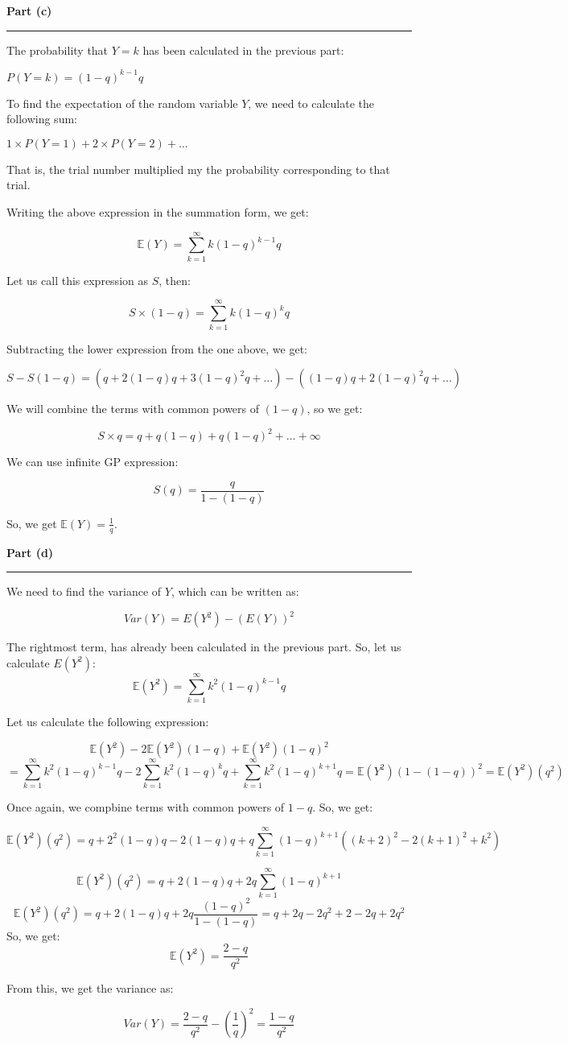 \documentclass[a4paper,12pt]{article}
\newenvironment{solution}[2][]{%
    \begin{mdframed}[linecolor=blue!70!black, linewidth=2pt, roundcorner=10pt, backgroundcolor=yellow!10!white, skipabove=12pt, skipbelow=12pt]%
        \textbf{\large #2}
        \par\noindent\rule{\textwidth}{0.4pt}
}{
    \end{mdframed}
}
\begin{document}
\begin{solution}{Part (c)}
  The probability that $Y = k$ has been calculated in the previous part:

  $P(Y = k) = (1-q)^{k-1}q$

  To find the expectation of the random variable $Y$, we need to calculate the following sum:

  $1\times P(Y = 1) + 2\times P(Y = 2) + \dots$

  That is, the trial number multiplied my the probability corresponding to that trial.


  Writing the above expression in the summation form, we get:

  \[\mathbb{E}(Y) = \sum_{k=1}^{\infty}k(1-q)^{k-1}q\]

  Let us call this expression as $S$, then:

  \[S\times(1-q) = \sum_{k=1}^{\infty}k(1-q)^{k}q\]

  Subtracting the lower expression from the one above, we get:

  \[S - S(1-q) = (q + 2(1-q)q + 3(1-q)^2q + \dots) - ((1-q)q + 2(1-q)^2q + \dots)\]

  We will combine the terms with common powers of $(1-q)$, so we get:

  \[S\times q = q + q(1-q) + q(1-q)^2 + \dots + \infty\]

  We can use infinite GP expression:

  \[S(q) = \frac{q}{1-(1-q)}\]

  So, we get $\mathbb{E}(Y) = \frac{1}{q}$.
\end{solution}

\begin{solution}{Part (d)}
  We need to find the variance of $Y$, which can be written as:

  \[Var(Y) = E(Y^2) - (E(Y))^2\]

  The rightmost term, has already been calculated in the previous part. So, let us calculate $E(Y^2)$:
  \[\mathbb{E}(Y^2) = \sum_{k=1}^{\infty}k^2(1-q)^{k-1}q\]

  Let us calculate the following expression:

  \[\mathbb{E}(Y^2) - 2\mathbb{E}(Y^2)(1-q) + \mathbb{E}(Y^2)(1-q)^2 \]
  \[= \sum_{k=1}^{\infty}k^2(1-q)^{k-1}q - 2\sum_{k=1}^{\infty}k^2(1-q)^{k}q + \sum_{k=1}^{\infty}k^2(1-q)^{k+1}q = \mathbb{E}(Y^2)(1-(1-q))^2 = \mathbb{E}(Y^2)(q^2)\]

  Once again, we compbine terms with common powers of $1-q$.  So, we get:

  \[\mathbb{E}(Y^2)(q^2) = q + 2^2(1-q)q -  2(1-q)q  + q\sum_{k=1}^{\infty}(1-q)^{k+1}((k+2)^2 - 2(k+1)^2 + k^2)\]

  \[\mathbb{E}(Y^2)(q^2) = q + 2(1-q)q + 2q\sum_{k=1}^{\infty}(1-q)^{k+1}\]
  \[\mathbb{E}(Y^2)(q^2) = q + 2(1-q)q + 2q\frac{(1-q)^2}{1-(1-q)} = q + 2q - 2q^2 + 2-2q + 2q^2\]
  So, we get:
  \[\mathbb{E}(Y^2) = \frac{2-q}{q^2}\]

  From this, we get the variance as:

  \[Var(Y) = \frac{2-q}{q^2} - (\frac{1}{q})^2 = \frac{1-q}{q^2}\]
  
\end{solution}
\end{document}
